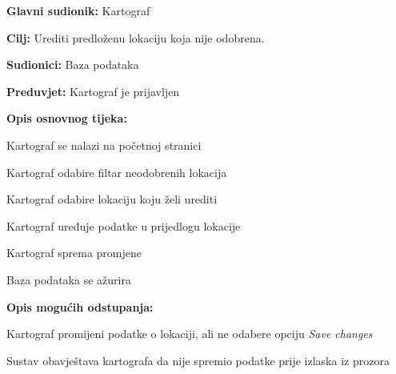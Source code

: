 					\noindent {}
					\begin{packed_item}
	
						\item \textbf{Glavni sudionik: }Kartograf
						\item  \textbf{Cilj:} Urediti predloženu lokaciju koja nije odobrena.
						\item  \textbf{Sudionici:} Baza podataka
						\item  \textbf{Preduvjet:} Kartograf je prijavljen
						\item  \textbf{Opis osnovnog tijeka:}
						
						\item[] \begin{packed_enum}
	
							\item Kartograf se nalazi na početnoj stranici
							\item Kartograf odabire filtar neodobrenih lokacija
							\item Kartograf odabire lokaciju koju želi urediti
							\item Kartograf uređuje podatke u prijedlogu lokacije
							\item Kartograf sprema promjene
							\item Baza podataka se ažurira

						\end{packed_enum}
						
						\item  \textbf{Opis mogućih odstupanja:}
						
						\item[] \begin{packed_item}
	
							\item[2.a] Kartograf promijeni podatke o lokaciji, ali ne odabere opciju \textit{Save changes}
							\item[] \begin{packed_enum}
								
								\item Sustav obavještava kartografa da nije spremio podatke prije izlaska iz prozora
								
							\end{packed_enum}
							
						\end{packed_item}
					\end{packed_item}
					
